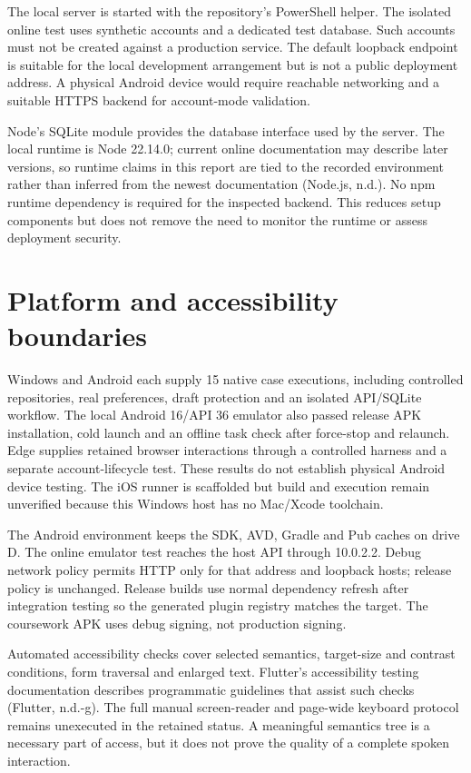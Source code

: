 \documentclass[12pt,a4paper,oneside]{report}
\begin{document}
The local server is started with the repository's PowerShell helper. The isolated online test uses synthetic accounts and a dedicated test database. Such accounts must not be created against a production service. The default loopback endpoint is suitable for the local development arrangement but is not a public deployment address. A physical Android device would require reachable networking and a suitable HTTPS backend for account-mode validation.

Node's SQLite module provides the database interface used by the server. The local runtime is Node 22.14.0; current online documentation may describe later versions, so runtime claims in this report are tied to the recorded environment rather than inferred from the newest documentation (Node.js, n.d.). No npm runtime dependency is required for the inspected backend. This reduces setup components but does not remove the need to monitor the runtime or assess deployment security.

\section{Platform and accessibility boundaries}
Windows and Android each supply 15 native case executions, including controlled repositories, real preferences, draft protection and an isolated API/SQLite workflow. The local Android 16/API 36 emulator also passed release APK installation, cold launch and an offline task check after force-stop and relaunch. Edge supplies retained browser interactions through a controlled harness and a separate account-lifecycle test. These results do not establish physical Android device testing. The iOS runner is scaffolded but build and execution remain unverified because this Windows host has no Mac/Xcode toolchain.

The Android environment keeps the SDK, AVD, Gradle and Pub caches on drive D. The online emulator test reaches the host API through 10.0.2.2. Debug network policy permits HTTP only for that address and loopback hosts; release policy is unchanged. Release builds use normal dependency refresh after integration testing so the generated plugin registry matches the target. The coursework APK uses debug signing, not production signing.

Automated accessibility checks cover selected semantics, target-size and contrast conditions, form traversal and enlarged text. Flutter's accessibility testing documentation describes programmatic guidelines that assist such checks (Flutter, n.d.-g). The full manual screen-reader and page-wide keyboard protocol remains unexecuted in the retained status. A meaningful semantics tree is a necessary part of access, but it does not prove the quality of a complete spoken interaction.
\end{document}
